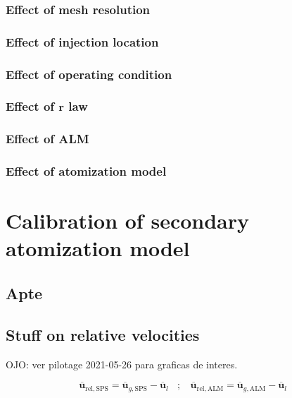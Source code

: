 \subsubsection*{Effect of mesh resolution}

\subsubsection*{Effect of injection location}

\subsubsection*{Effect of operating condition}

\subsubsection*{Effect of $\textbf{r}$ law}

\subsubsection*{Effect of ALM}

\subsubsection*{Effect of atomization model}

\clearpage

\section{Calibration of secondary atomization model}

\subsection{Apte}

\subsection{Stuff on relative velocities}

OJO: ver pilotage 2021-05-26 para graficas de interes.

\begin{equation}
\overline{\textbf{u}}_\mathrm{rel,SPS} = \overline{\textbf{u}}_{g,\mathrm{SPS}} - \overline{\textbf{u}}_l ~~~~ ; ~~~~  \overline{\textbf{u}}_\mathrm{rel,ALM} = \overline{\textbf{u}}_{g,\mathrm{ALM}} - \overline{\textbf{u}}_l
\end{equation}

